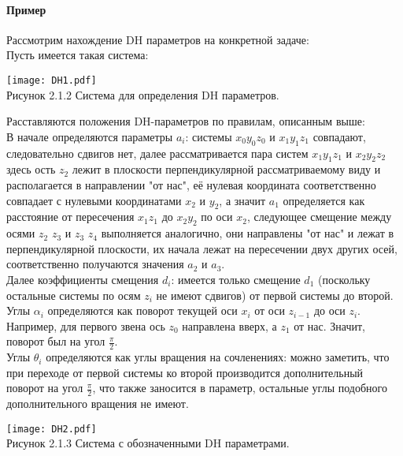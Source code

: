  \paragraph*{Пример\\}
 
\hspace*{\parindent}Рассмотрим нахождение DH параметров на конкретной задаче:\\

Пусть имеется такая система:\\
\begin{center}
    \texttt{[image: DH1.pdf]}\\
    Рисунок 2.1.2 Система для определения DH параметров.\\
\end{center}


\hspace*{\parindent}Расставляются положения DH-параметров по правилам, описанным выше:\\ 
\hspace*{\parindent}В начале определяются параметры $a_i$: системы $x_0y_0z_0$ и $x_1y_1z_1$ совпадают, следовательно сдвигов нет, далее рассматривается пара систем $x_1y_1z_1$ и $x_2y_2z_2$ здесь ость $z_2$ лежит в плоскости перпендикулярной рассматриваемому виду и располагается в направлении "от нас", её нулевая координата соответственно совпадает с нулевыми координатами $x_2$ и $y_2$, а значит $a_1$ определяется как расстояние от пересечения $x_1z_1$ до  $x_2y_2$ по оси $x_2$, следующее смещение между осями $z_2$ $z_3$ и $z_3$ $z_4$ выполняется аналогично, они направлены "от нас" и лежат в перпендикулярной плоскости, их начала лежат на пересечении двух других осей, соответственно получаются значения $a_2$ и $a_3$.\\
\hspace*{\parindent}Далее коэффициенты смещения $d_i$: имеется только смещение $d_1$ (поскольку остальные системы по осям $z_i$ не имеют сдвигов) от первой системы до второй.\\
Углы $\alpha_i$ определяются как поворот текущей оси $x_i$ от оси $z_{i-1}$ до оси $z_{i}$. Например, для первого звена ось $z_0$ направлена вверх, а $z_1$ от нас. Значит, поворот был на угол $\frac{\pi}{2}$. \\
\hspace*{\parindent}Углы $\theta_i$ определяются как углы вращения на сочленениях: можно заметить, что при переходе от первой системы ко второй производится дополнительный поворот на угол $\frac{\pi}{2}$, что также заносится в параметр, остальные углы подобного дополнительного вращения не имеют.\\
\begin{center}
    \texttt{[image: DH2.pdf]}\\
    Рисунок 2.1.3 Система с обозначенными DH параметрами.\\
\end{center}



